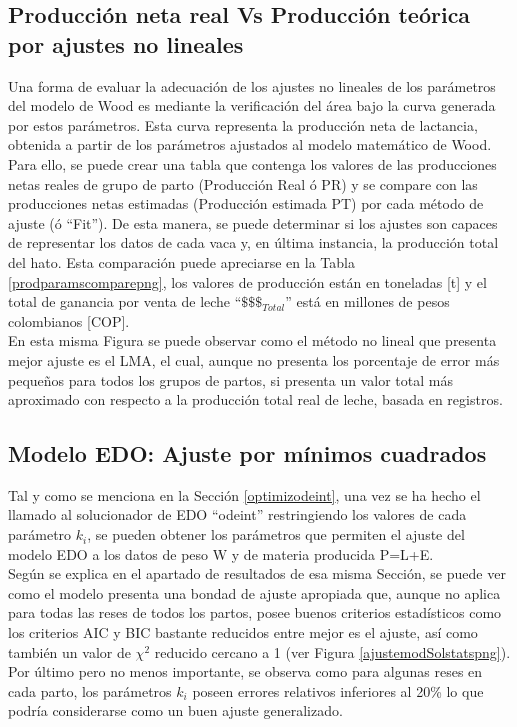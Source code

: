 \subsection{Producción neta real Vs Producción teórica por ajustes no lineales}

Una forma de evaluar la adecuación de los ajustes no lineales de los parámetros del modelo de Wood es mediante la verificación del área bajo la curva generada por estos parámetros. Esta curva representa la producción neta de lactancia, obtenida a partir de los parámetros ajustados al modelo matemático de Wood. Para ello, se puede crear una tabla que contenga los valores de las producciones netas reales de grupo de parto (Producción Real ó PR) y se compare con las producciones netas estimadas (Producción estimada PT) por cada método de ajuste (ó ``Fit''). De esta manera, se puede determinar si los ajustes son capaces de representar los datos de cada vaca y, en última instancia, la producción total del hato. Esta comparación puede apreciarse en la Tabla \ref{prodparamscomparepng}, los valores de producción están en toneladas [t] y el total de ganancia por venta de leche ``$\$\$\$_{Total}$'' está en millones de pesos colombianos [COP].\\

En esta misma Figura se puede observar como el método no lineal que presenta mejor ajuste es el LMA, el cual, aunque no presenta los porcentaje de error más pequeños para todos los grupos de partos, si presenta un valor total más aproximado con respecto a la producción total  real de leche, basada en registros.

\subsection{Modelo EDO: Ajuste por mínimos cuadrados}

Tal y como se menciona en la Sección \ref{optimizodeint}, una vez se ha hecho el llamado al solucionador de EDO ``odeint'' restringiendo los valores de cada parámetro $k_{i}$, se pueden obtener los parámetros que permiten el ajuste del modelo EDO a los datos de peso W y de materia producida P=L+E. \\

Según se explica en el apartado de resultados de esa misma Sección, se puede ver como el modelo presenta una bondad de ajuste apropiada que, aunque no aplica para todas las reses de todos los partos, posee buenos criterios estadísticos como los criterios AIC y BIC bastante reducidos entre mejor es el ajuste, así como también un valor de $\chi^{2}$ reducido cercano a 1 (ver Figura \ref{ajustemodSolstatspng}). Por último pero no menos importante, se observa como para algunas reses en cada parto, los parámetros $k_{i}$ poseen errores relativos inferiores al 20\% lo que podría considerarse como un buen ajuste generalizado. \\

